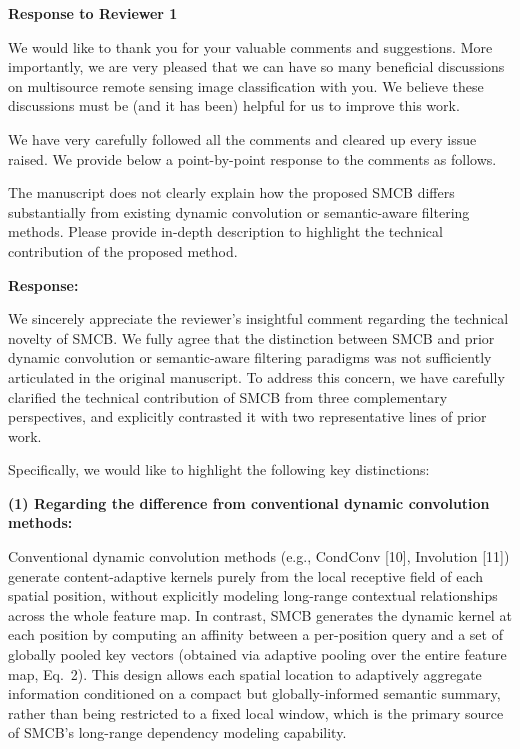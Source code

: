 \label{re:review_1}

\begin{center}
  \large\bf Response to Reviewer 1
\end{center}

We would like to thank you for your valuable comments and suggestions. More importantly, we are very pleased that we can have so many beneficial discussions on multisource remote sensing image classification with you. We believe these discussions must be (and it has been) helpful for us to improve this work.

We have very carefully followed all the comments and cleared up every issue raised. We provide below a point-by-point response to the comments as follows.

\begin{tcolorbox}[title={Reviewer \#1, Comment \#1}] 
\vspace{1em}
{\color{blue}
The manuscript does not clearly explain how the proposed SMCB differs substantially from existing dynamic convolution or semantic-aware filtering methods. Please provide in-depth description to highlight the technical contribution of the proposed method.
}
\vspace{1em}
\end{tcolorbox}

\textbf{Response:}

We sincerely appreciate the reviewer's insightful comment regarding the technical novelty of SMCB. We fully agree that the distinction between SMCB and prior dynamic convolution or semantic-aware filtering paradigms was not sufficiently articulated in the original manuscript. To address this concern, we have carefully clarified the technical contribution of SMCB from three complementary perspectives, and explicitly contrasted it with two representative lines of prior work.

Specifically, we would like to highlight the following key distinctions:

\textbf{(1) Regarding the difference from conventional dynamic convolution methods:}

Conventional dynamic convolution methods (e.g., CondConv [10], Involution [11]) generate content-adaptive kernels purely from the local receptive field of each spatial position, without explicitly modeling long-range contextual relationships across the whole feature map. In contrast, SMCB generates the dynamic kernel at each position by computing an affinity between a per-position query and a set of globally pooled key vectors (obtained via adaptive pooling over the entire feature map, Eq.~2). This design allows each spatial location to adaptively aggregate information conditioned on a compact but globally-informed semantic summary, rather than being restricted to a fixed local window, which is the primary source of SMCB's long-range dependency modeling capability.

